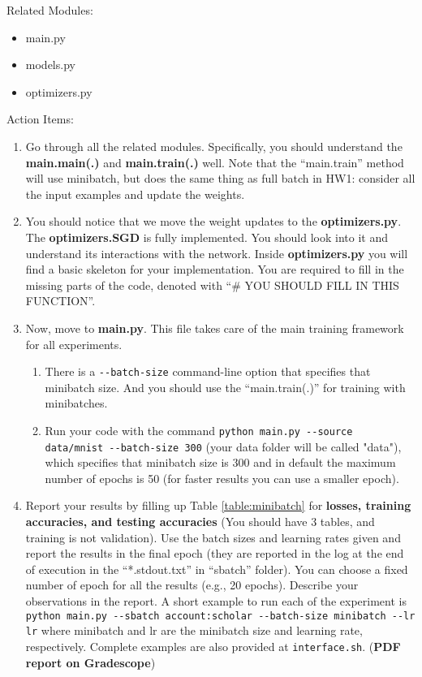 \noindent Related Modules: 
\begin{itemize} 
\item main.py
\item models.py
\item optimizers.py
\end{itemize}

\hfill

\noindent Action Items:
\begin{enumerate}

\item Go through all the related modules. Specifically, you should understand the \textbf{main.main(.)} and \textbf{main.train(.)} well.
  Note that the ``main.train'' method will use minibatch, but does the same thing as full batch in HW1: consider all the input examples and update the weights.

\item You should notice that we move the weight updates to the \textbf{optimizers.py}. The \textbf{optimizers.SGD} is fully implemented. You should look into it and understand its interactions with the network. Inside {\bf optimizers.py} you will find a basic skeleton for your implementation. You are required to fill in the missing parts of the code, denoted with ``\# YOU SHOULD FILL IN THIS FUNCTION''.


\item Now, move to \textbf{main.py}. This file takes care of the main training framework for all experiments.
    \begin{enumerate}
        \item There is a \verb|--batch-size| command-line option that specifies that minibatch size. And you should use the ``main.train(.)'' for training with minibatches.

        \item Run your code with the command \verb|python main.py --source data/mnist --batch-size 300| (your data folder will be called "data"), which specifies that minibatch size is 300 and in default the maximum number of epochs is 50 (for faster results you can use a smaller epoch). 
    \end{enumerate}

\item Report your results by filling up Table \ref{table:minibatch} for \textbf{losses, training accuracies, and testing accuracies} (You should have 3 tables, and training is not validation). Use the batch sizes and learning rates given and report the results in the final epoch (they are reported in the log at the end of execution in the ``*.stdout.txt'' in ``sbatch'' folder). You can choose a fixed number of epoch for all the results (e.g., 20 epochs). Describe your observations in the report. A short example to run each of the experiment is \verb|python main.py --sbatch account:scholar --batch-size minibatch --lr lr| where minibatch and lr are the minibatch size and learning rate, respectively. Complete examples are also provided at \texttt{interface.sh}. ({\bf PDF report on Gradescope})


\end{enumerate}
